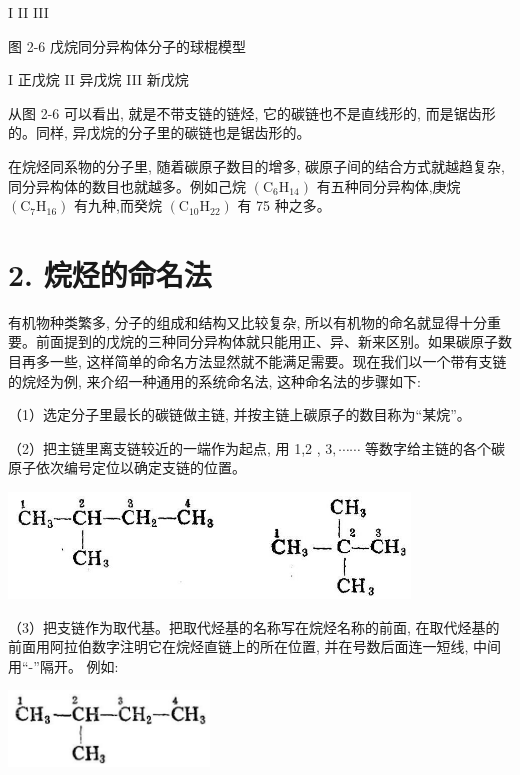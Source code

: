 \documentclass[10pt]{article}
\begin{document}
I II III

图 2-6 戊烷同分异构体分子的球棍模型

I 正戊烷 II 异戊烷 III 新戊烷

从图 2-6 可以看出, 就是不带支链的链烃, 它的碳链也不是直线形的, 而是锯齿形的。同样, 异戊烷的分子里的碳链也是锯齿形的。

在烷烃同系物的分子里, 随着碳原子数目的增多, 碳原子间的结合方式就越趋复杂, 同分异构体的数目也就越多。例如己烷 \(\left( {{\mathrm{C}}_{6}{\mathrm{H}}_{14}}\right)\) 有五种同分异构体,庚烷 \(\left( {{\mathrm{C}}_{7}{\mathrm{H}}_{16}}\right)\) 有九种,而癸烷 \(\left( {{\mathrm{C}}_{10}{\mathrm{H}}_{22}}\right)\) 有 75 种之多。

\section*{2. 烷烃的命名法}

有机物种类繁多, 分子的组成和结构又比较复杂, 所以有机物的命名就显得十分重要。前面提到的戊烷的三种同分异构体就只能用正、异、新来区别。如果碳原子数目再多一些, 这样简单的命名方法显然就不能满足需要。现在我们以一个带有支链的烷烃为例, 来介绍一种通用的系统命名法, 这种命名法的步骤如下:

（1）选定分子里最长的碳链做主链, 并按主链上碳原子的数目称为“某烷”。

（2）把主链里离支链较近的一端作为起点, 用 1,2 , \(3,\cdots \cdots\) 等数字给主链的各个碳原子依次编号定位以确定支链的位置。

\begin{center}
\includegraphics[max width=0.8\textwidth]{images/01912d16-be99-77bb-9535-4f3ed8d9946f_64_178503.jpg}
\end{center}

（3）把支链作为取代基。把取代烃基的名称写在烷烃名称的前面, 在取代烃基的前面用阿拉伯数字注明它在烷烃直链上的所在位置, 并在号数后面连一短线, 中间用“-”隔开。 例如:

\begin{center}
\includegraphics[max width=0.4\textwidth]{images/01912d16-be99-77bb-9535-4f3ed8d9946f_65_787304.jpg}
\end{center}
\end{document}
